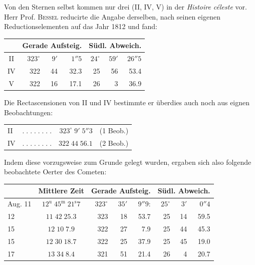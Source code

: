 \par\indent Von den Sternen selbst kommen nur drei (II, IV, V) in der \emph{Histoire céleste} vor. Herr Prof. \textsc{Bessel} reducirte die Angabe derselben, nach seinen eigenen Reductionselementen auf das Jahr 1812 und fand:

\begin{center}\fontsize{10}{12}\selectfont\setlength{\tabcolsep}{4pt}\renewcommand{\arraystretch}{1.15}\begin{tabular}{c|rrr|rrr}
& \multicolumn{3}{c|}{Gerade Aufsteig.} & \multicolumn{3}{c}{Südl. Abweich.}\\\hline
II & $323^\circ$ & $9'$ & $1''5$ & $24^\circ$ & $59'$ & $26''5$\\
IV & 322 & 44 & 32.3 & 25 & 56 & 53.4\\
V & 322 & 16 & 17.1 & 26 & 3 & 36.9\\
\end{tabular}\end{center}

\par\indent Die Rectascensionen von II und IV bestimmte er überdies auch noch aus eignen Beobachtungen:

\begin{center}\fontsize{10}{12}\selectfont\setlength{\tabcolsep}{4pt}\renewcommand{\arraystretch}{1.15}\begin{tabular}{lcrl}
II & $.\;.\;.\;.\;.\;.\;.\;.$ & $323^\circ\;9'\;5''3$ & (1 Beob.)\\
IV & $.\;.\;.\;.\;.\;.\;.\;.$ & $322\;44\;56.1$ & (2 Beob.)\\
\end{tabular}\end{center}

\par\indent Indem diese vorzugsweise zum Grunde gelegt wurden, ergaben sich also folgende beobachtete Oerter des Cometen:

\begin{center}\fontsize{9}{11}\selectfont\setlength{\tabcolsep}{3pt}\renewcommand{\arraystretch}{1.15}\begin{tabular}{l|c|rrr|rrr}
& Mittlere Zeit & \multicolumn{3}{c|}{Gerade Aufsteig.} & \multicolumn{3}{c}{Südl. Abweich.}\\\hline
Aug. 11 & $12^{\mathrm u}\;45^{\mathrm m}\;21^{\mathrm s}7$ & $323^\circ$ & $35'$ & $9''9$: & $25^\circ$ & $3'$ & $0''4$\\
12 & $11\;42\;25.3$ & 323 & 18 & 53.7 & 25 & 14 & 59.5\\
15 & $12\;10\;7.9$ & 322 & 27 & 7.9 & 25 & 44 & 45.3\\
15 & $12\;30\;18.7$ & 322 & 25 & 37.9 & 25 & 45 & 19.0\\
17 & $13\;34\;8.4$ & 321 & 51 & 21.4 & 26 & 4 & 20.7\\
\end{tabular}\end{center}

